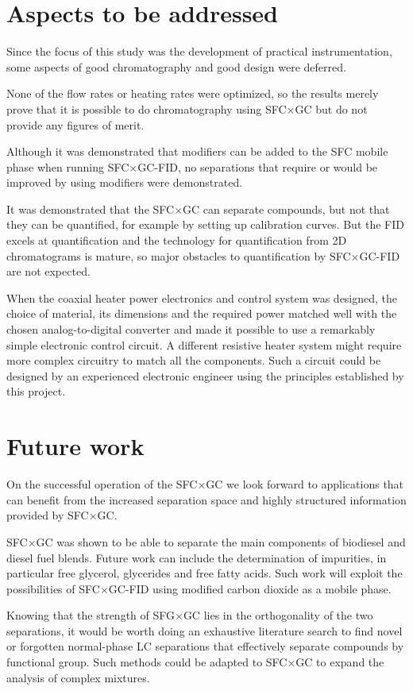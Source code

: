 \section{Aspects to be addressed} 

Since the focus of this study was the development of practical instrumentation,
some aspects of good chromatography and good design were deferred.

None of the flow rates or heating rates were optimized, so the results merely
prove that it is possible to do chromatography using SFC×GC but do not provide
any figures of merit.

Although it was demonstrated that modifiers can be added to the SFC mobile phase
when running SFC×GC-FID, no separations that require or would be improved by
using modifiers were demonstrated.

It was demonstrated that the SFC×GC can separate compounds, but not that they
can be quantified, for example by setting up calibration curves. But the FID
excels at quantification and the technology for quantification from 2D
chromatograms is mature, so major obstacles to quantification by SFC×GC-FID are
not expected.

When the coaxial heater power electronics and control system was designed, the
choice of material, its dimensions and the required power matched well with the
chosen analog-to-digital converter and made it possible to use a remarkably
simple electronic control circuit. A different resistive heater system might
require more complex circuitry to match all the components. Such a circuit could
be designed by an experienced electronic engineer using the principles
established by this project.

\section{Future work}

On the successful operation of the SFC×GC we look forward to applications that
can benefit from the increased separation space and highly structured
information provided by SFC×GC.

SFC×GC was shown to be able to separate the main components of biodiesel and
diesel fuel blends. Future work can include the determination of impurities, in
particular free glycerol, glycerides and free fatty acids. Such work will
exploit the possibilities of SFC×GC-FID using modified carbon dioxide as a
mobile phase.

Knowing that the strength of SFG×GC lies in the orthogonality of the two
separations, it would be worth doing an exhaustive literature search to find
novel or forgotten normal-phase LC separations that effectively separate
compounds by functional group. Such methods could be adapted to SFC×GC to expand
the analysis of complex mixtures.

